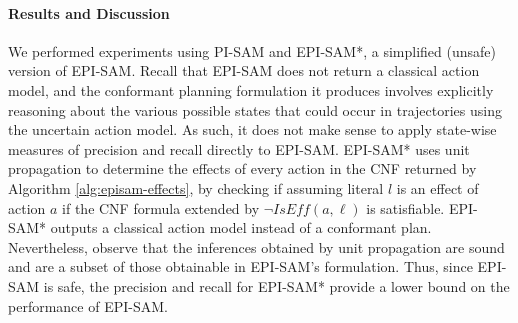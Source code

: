 \documentclass[letterpaper]{article} %
\newcommand{\iseff}{\textit{IsEff}}
\newcommand{\hai}[1]{{\textcolor{orange}{[Hai: #1]}}}
\newcommand{\roni}[1]{ }
\begin{document}

\paragraph{Results and Discussion}
We performed experiments using PI-SAM and EPI-SAM*, a simplified (unsafe) version of EPI-SAM. Recall that EPI-SAM does not return a classical action model, and the conformant planning formulation it produces involves explicitly reasoning about the various possible states that could occur in trajectories using the uncertain action model. As such, it does not make sense to apply state-wise measures of precision and recall directly to EPI-SAM.
EPI-SAM* uses unit propagation to determine the effects of every action in the CNF returned by Algorithm \ref{alg:episam-effects}, by checking if assuming literal $l$ is an effect of action $a$ if the CNF formula extended by $\neg\iseff(a,\ell)$ is satisfiable.\roni{This sentence is not clear.}
EPI-SAM* outputs a classical action model instead of a conformant plan. %
Nevertheless, observe that the inferences obtained by unit propagation are sound and are a subset of those obtainable in EPI-SAM's formulation. Thus, since EPI-SAM is safe, the precision and recall for EPI-SAM* provide a lower bound on the performance of EPI-SAM. %
\end{document}
